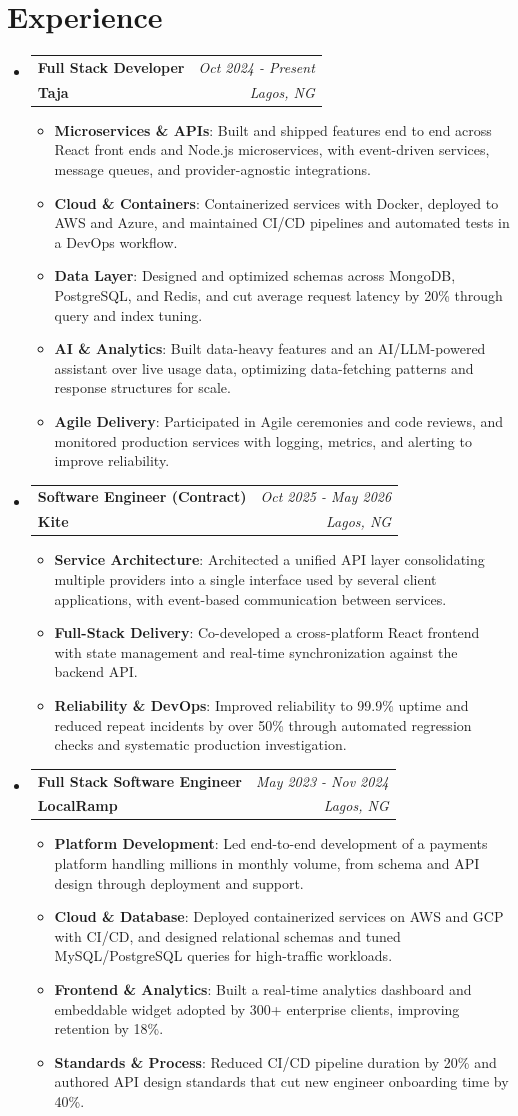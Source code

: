 \documentclass[a4paper]{article}
\makeatletter
\newcommand{\resumeItem}[2]{ \item\small{ \textbf{#1}: #2 } }
\newcommand{\resumeJobHeading}[4]{ %
\vspace{2pt}
\item[]
\begin{tabular*}{0.97\textwidth}{l@{\extracolsep{\fill}}r}
	\textbf{#1} & \textit{#3} \\
	\textbf{#4} & \textit{#2} \\
\end{tabular*}
\vspace{0pt}
}
\newcommand{\resumeSubHeadingListStart}{\begin{itemize}[leftmargin=*,topsep=1pt]}
\newcommand{\resumeSubHeadingListEnd}{\end{itemize}}
\newcommand{\resumeItemListStart}{\begin{itemize}[topsep=0pt,itemsep=0pt,parsep=0pt]}
\newcommand{\resumeItemListEnd}{\end{itemize}}
\makeatother
\begin{document}
	\vspace{4pt}
	\section{Experience}
	\resumeSubHeadingListStart
	\resumeJobHeading{Full Stack Developer}{Lagos, NG}{Oct 2024 - Present}{Taja}
	\resumeItemListStart
	\resumeItem{Microservices \& APIs}
	{Built and shipped features end to end across React front ends and Node.js microservices, with event-driven services, message queues, and provider-agnostic integrations.}
	\resumeItem{Cloud \& Containers}
	{Containerized services with Docker, deployed to AWS and Azure, and maintained CI/CD pipelines and automated tests in a DevOps workflow.}
	\resumeItem{Data Layer}
	{Designed and optimized schemas across MongoDB, PostgreSQL, and Redis, and cut average request latency by 20\% through query and index tuning.}
	\resumeItem{AI \& Analytics}
	{Built data-heavy features and an AI/LLM-powered assistant over live usage data, optimizing data-fetching patterns and response structures for scale.}
	\resumeItem{Agile Delivery}
	{Participated in Agile ceremonies and code reviews, and monitored production services with logging, metrics, and alerting to improve reliability.}
	\resumeItemListEnd

	\resumeJobHeading{Software Engineer (Contract)}{Lagos, NG}{Oct 2025 - May 2026}{Kite}
	\resumeItemListStart
	\resumeItem{Service Architecture}
	{Architected a unified API layer consolidating multiple providers into a single interface used by several client applications, with event-based communication between services.}
	\resumeItem{Full-Stack Delivery}
	{Co-developed a cross-platform React frontend with state management and real-time synchronization against the backend API.}
	\resumeItem{Reliability \& DevOps}
{Improved reliability to 99.9\% uptime and reduced repeat incidents by over 50\% through automated regression checks and systematic production investigation.}
	\resumeItemListEnd

	\resumeJobHeading{Full Stack Software Engineer}{Lagos, NG}{May 2023 - Nov 2024}{LocalRamp}
	\resumeItemListStart
	\resumeItem{Platform Development}
	{Led end-to-end development of a payments platform handling millions in monthly volume, from schema and API design through deployment and support.}
	\resumeItem{Cloud \& Database}
	{Deployed containerized services on AWS and GCP with CI/CD, and designed relational schemas and tuned MySQL/PostgreSQL queries for high-traffic workloads.}
	\resumeItem{Frontend \& Analytics}
	{Built a real-time analytics dashboard and embeddable widget adopted by 300+ enterprise clients, improving retention by 18\%.}
	\resumeItem{Standards \& Process}
	{Reduced CI/CD pipeline duration by 20\% and authored API design standards that cut new engineer onboarding time by 40\%.}
	\resumeItemListEnd
	\resumeSubHeadingListEnd
\end{document}
